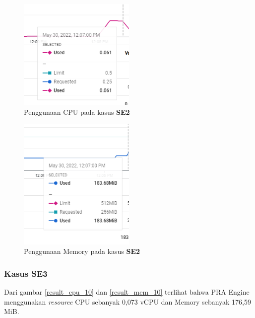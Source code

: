 \begin{figure}[!htb]
	\centering
	\includegraphics[width=0.5\textwidth]{resources/ch4/resource/9-cpu.png}
	\caption{Penggunaan CPU pada kasus \textbf{SE2}}
	\label{result_cpu_9}
\end{figure}

\begin{figure}[!htb]
	\centering
	\includegraphics[width=0.5\textwidth]{resources/ch4/resource/9-mem.png}
	\caption{Penggunaan Memory pada kasus \textbf{SE2}}
	\label{result_mem_9}
\end{figure}

\pagebreak

\subsubsection{Kasus SE3}
Dari gambar \ref{result_cpu_10} dan \ref{result_mem_10} terlihat bahwa PRA Engine menggunakan \textit{resource} CPU sebanyak 0,073 vCPU dan Memory sebanyak 176,59 MiB. 

